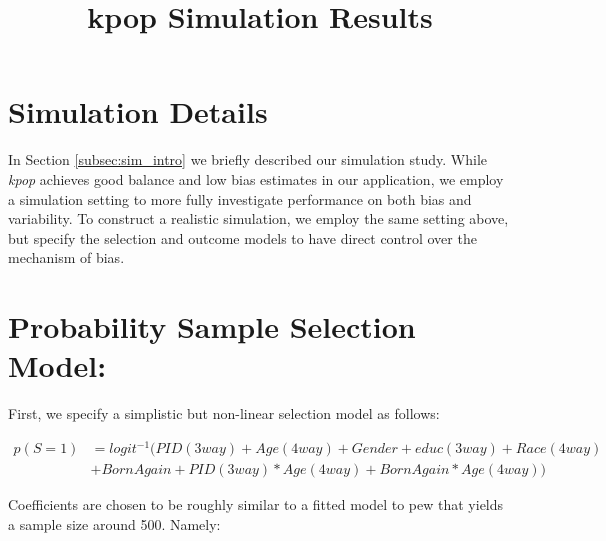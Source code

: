 \documentclass[
]{article}
\title{kpop Simulation Results}
\author{}
\date{\vspace{-2.5em}}
\begin{document}
\maketitle

\section{Simulation Details}
\label{app:simulations}

In Section \ref{subsec:sim_intro} we briefly described our simulation
study. While \textit{kpop} achieves good balance and low bias estimates
in our application, we employ a simulation setting to more fully
investigate performance on both bias and variability. To construct a
realistic simulation, we employ the same setting above, but specify the
selection and outcome models to have direct control over the mechanism
of bias.

\hypertarget{probability-sample-selection-model}{%
\section{Probability Sample Selection
Model:}\label{probability-sample-selection-model}}

First, we specify a simplistic but non-linear selection model as
follows:

\begin{align*}
p(S=1) &= logit^{-1}\Big( PID(3way) + Age(4way)+ Gender + educ(3way) + Race(4way) \\ 
&+ BornAgain + PID(3way)*Age(4way) + BornAgain*Age(4way)\Big)
\end{align*}

Coefficients are chosen to be roughly similar to a fitted model to pew
that yields a sample size around 500. Namely:
\end{document}
